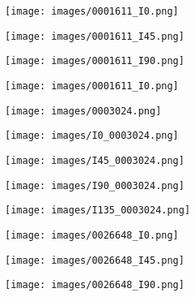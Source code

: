\begin{figure}
	\centering
	\begin{subfigure}{.11\textwidth}
		\centering
		\texttt{[image: images/0001611\_I0.png]}
	\end{subfigure}%
	\begin{subfigure}{.11\textwidth}
		\centering
		\texttt{[image: images/0001611\_I45.png]}
	\end{subfigure}%
	\begin{subfigure}{.11\textwidth}
		\centering
		\texttt{[image: images/0001611\_I90.png]}
	\end{subfigure}%
	\begin{subfigure}{.11\textwidth}
		\centering
		\texttt{[image: images/0001611\_I0.png]}
	\end{subfigure}%
	\begin{subfigure}{.105\textwidth}
		\centering
		\texttt{[image: images/0003024.png]}
	\end{subfigure}%
	\begin{subfigure}{.105\textwidth}
		\centering
		\texttt{[image: images/I0\_0003024.png]}
	\end{subfigure}%
	\begin{subfigure}{.105\textwidth}
		\centering
		\texttt{[image: images/I45\_0003024.png]}
	\end{subfigure}%
	\begin{subfigure}{.105\textwidth}
		\centering
		\texttt{[image: images/I90\_0003024.png]}
	\end{subfigure}%
	\begin{subfigure}{.105\textwidth}
		\centering
		\texttt{[image: images/I135\_0003024.png]}
	\end{subfigure}
	\begin{subfigure}{.11\textwidth}
		\centering
		\texttt{[image: images/0026648\_I0.png]}
	\end{subfigure}%
	\begin{subfigure}{.11\textwidth}
		\centering
		\texttt{[image: images/0026648\_I45.png]}
	\end{subfigure}%
	\begin{subfigure}{.11\textwidth}
		\centering
		\texttt{[image: images/0026648\_I90.png]}
	\end{subfigure}%
	\begin{subfigure}{.11\textwidth}

\end{subfigure}
\end{figure}
